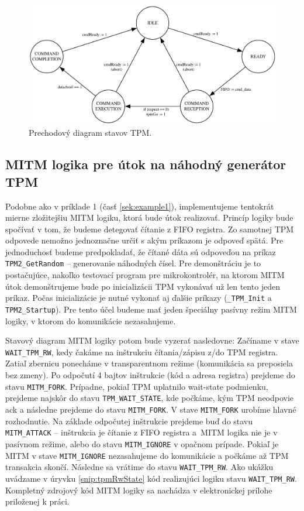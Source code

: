 \begin{figure}
    \centerline{\includegraphics[width=1\textwidth]{images/misc/tpmStateTransition.pdf}}
    \caption[Prechodový diagram stavov TPM]{Prechodový diagram stavov TPM.}
    \label{obr:tpmStateTransition}
\end{figure}

\subsection{MITM logika pre útok na náhodný generátor TPM}
Podobne ako v príklade 1 (časť \ref{sek:example1}), implementujeme tentokrát mierne zložitejšiu MITM logiku, ktorá bude útok realizovať. Princíp logiky bude spočívať v tom, že budeme detegovať čítanie z FIFO registra. Zo samotnej TPM odpovede nemožno jednoznačne určiť s akým príkazom je odpoveď spätá. Pre jednoduchosť budeme predpokladať, že čítané dáta sú odpoveďou na príkaz \texttt{TPM2\_GetRandom} -- generovanie náhodných čísel. Pre demonštráciu je to postačujúce, nakoľko testovací program pre mikrokontrolér, na ktorom MITM útok demonštrujeme bude po inicializácii TPM vykonávať už len tento jeden príkaz. Počas inicializácie je nutné vykonať aj ďalšie príkazy (\texttt{\_TPM\_Init} a \texttt{TPM2\_Startup}). Pre tento účel budeme mať jeden špeciálny pasívny režim MITM logiky, v ktorom do komunikácie nezasahujeme.

Stavový diagram MITM logiky potom bude vyzerať nasledovne: Začíname v stave \texttt{WAIT\_TPM\_RW}, kedy čakáme na inštrukciu čítania/zápisu z/do TPM registra. Zatiaľ zbernicu ponecháme v transparentnom režime (komunikácia sa preposiela bez zmeny). Po odpočutí 4 bajtov inštrukcie (kód a adresa registra) prejdeme do stavu \texttt{MITM\_FORK}. Prípadne, pokiaľ TPM uplatnilo wait-state podmienku, prejdeme najskôr do stavu \texttt{TPM\_WAIT\_STATE}, kde počkáme, kým TPM neodpovie ack a následne prejdeme do stavu \texttt{MITM\_FORK}. V stave \texttt{MITM\_FORK} urobíme hlavné rozhodnutie. Na základe odpočutej inštrukcie prejdeme buď do stavu \texttt{MITM\_ATTACK} -- inštrukcia je čítanie z FIFO registra a~MITM logika nie je v pasívnom režime, alebo do stavu \texttt{MITM\_IGNORE} v opačnom prípade. Pokiaľ je MITM v stave \texttt{MITM\_IGNORE} nezasahujeme do komunikácie a počkáme až TPM transakcia skončí. Následne sa vrátime do stavu \texttt{WAIT\_TPM\_RW}. Ako ukážku uvádzame v úryvku \ref{snip:tpmRwState} kód realizujúci logiku stavu \texttt{WAIT\_TPM\_RW}. Kompletný zdrojový kód MITM logiky sa nachádza v elektronickej prílohe priloženej k práci.

